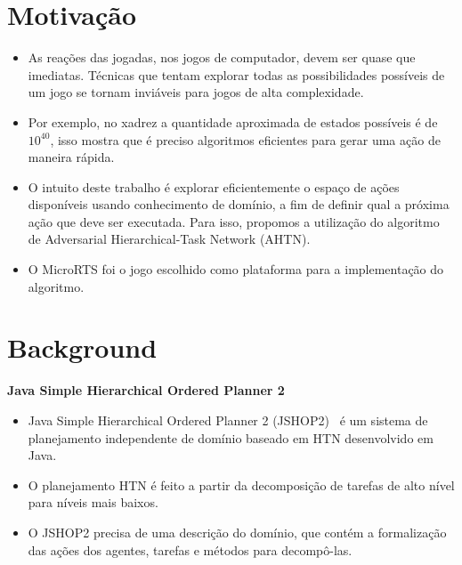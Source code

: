 \documentclass[a0,portrait]{a0poster}
\newcommand\itemadjust{\itemsep.5em \parskip0pt \parsep0pt}
\begin{document}
\begin{multicols}{2} 
	\color{NavyBlue}
	\color{Black}
	\raggedright
	\Large
	\color{NavyBlue}
	\section*{\huge Motiva\c{c}\~ao}
	\color{Black}
	
	\begin{itemize}
		\item As reações das jogadas, nos jogos de computador, devem ser quase que imediatas. Técnicas que tentam explorar todas as possibilidades possíveis de um jogo se tornam inviáveis para jogos de alta complexidade.
		\item Por exemplo, no xadrez a quantidade aproximada de estados possíveis é de $10^{40}$, isso mostra que é preciso algoritmos eficientes para gerar uma ação de maneira rápida. 
		\item O intuito deste trabalho é explorar eficientemente o espaço de ações disponíveis usando conhecimento de domínio, a fim de definir qual a próxima ação que deve ser executada. Para isso, propomos a utilização do algoritmo de Adversarial Hierarchical-Task Network (AHTN).
		\item O MicroRTS foi o jogo escolhido como plataforma para a implementação do algoritmo.
	\end{itemize}
	
	\color{NavyBlue}
	\section*{\huge Background}
	\color{Black}
	
	\textbf{Java Simple Hierarchical Ordered Planner 2}
	\begin{itemize}
		\item Java Simple Hierarchical Ordered Planner 2 (JSHOP2)~\cite{ilghami2006documentation} é um sistema de planejamento independente de domínio baseado em HTN desenvolvido em Java.
		\item O planejamento HTN é feito a partir da decomposição de tarefas de alto nível para níveis mais baixos. 
		\item O JSHOP2 precisa de uma descrição do domínio, que contém a formalização das ações dos agentes, tarefas e métodos para decompô-las. 
	\end{itemize}
		

\end{multicols}
\end{document}
